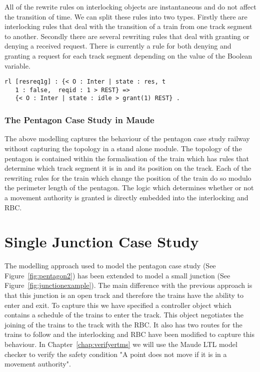 All of the rewrite rules on interlocking objects are instantaneous and do not affect the transition of time.  We can split these rules into two types. Firstly there are interlocking rules that deal with the transition of a train from one track segment to another. Secondly there are several rewriting rules that deal with granting or denying a received request. There is currently a rule for both denying and granting a request for each track segment depending on the value of the Boolean variable.

\begin{lstlisting}[caption = The interlocking transition which grants a track segment request]
rl [resreq1g] : {< O : Inter | state : res, t
   1 : false,  reqid : 1 > REST} => 
   {< O : Inter | state : idle > grant(1) REST} .
\end{lstlisting}

\subsubsection*{The Pentagon Case Study in Maude}
The above modelling captures the behaviour of the pentagon case study railway without capturing the topology in a stand alone module. The topology of the pentagon is contained within the formalisation of the train which has rules that determine which track segment it is in and its position on the track. Each of the rewriting rules for the train which change the position of the train do so modulo the perimeter length of the pentagon. The logic which determines whether or not a movement authority is granted is directly embedded into the interlocking and RBC.

\section{Single Junction Case Study}
The modelling approach used to model the pentagon case study (See Figure~\ref{fig:pentagon2}) has been extended to model a small junction (See Figure~\ref{fig:junctionexample}). The main difference with the previous approach is that this junction is an open track and therefore the trains have the ability to enter and exit. To capture this we have specified a controller object which contains a schedule of the trains to enter the track. This object negotiates the joining of the trains to the track with the RBC. It also has two routes for the trains to follow and the interlocking and RBC have been modified to capture this behaviour.  In Chapter~\ref{chap:verifyertms} we will use the Maude LTL model checker to verify the safety condition "A point does not move if it is in a movement authority".
 
